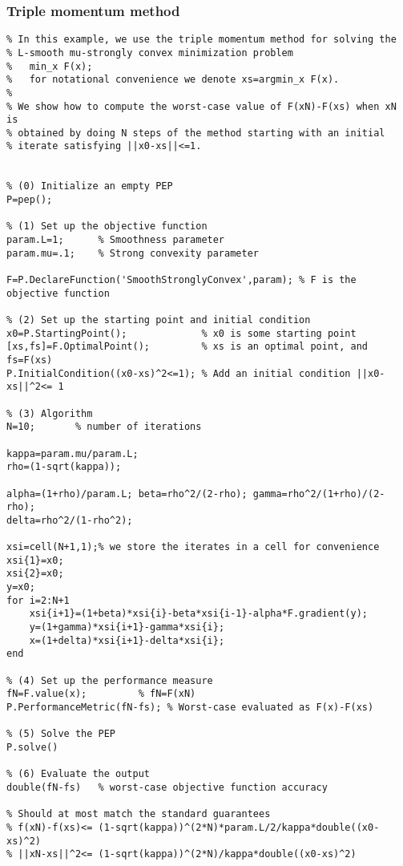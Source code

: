\documentclass[11pt,a4paper]{article}
\begin{document}
\subsubsection{Triple momentum method}
\begin{lstlisting}
% In this example, we use the triple momentum method for solving the 
% L-smooth mu-strongly convex minimization problem
%   min_x F(x); 
%   for notational convenience we denote xs=argmin_x F(x).
%
% We show how to compute the worst-case value of F(xN)-F(xs) when xN is
% obtained by doing N steps of the method starting with an initial
% iterate satisfying ||x0-xs||<=1.


% (0) Initialize an empty PEP
P=pep();

% (1) Set up the objective function
param.L=1;      % Smoothness parameter
param.mu=.1;    % Strong convexity parameter

F=P.DeclareFunction('SmoothStronglyConvex',param); % F is the objective function

% (2) Set up the starting point and initial condition
x0=P.StartingPoint();             % x0 is some starting point
[xs,fs]=F.OptimalPoint();         % xs is an optimal point, and fs=F(xs)
P.InitialCondition((x0-xs)^2<=1); % Add an initial condition ||x0-xs||^2<= 1

% (3) Algorithm
N=10;		% number of iterations

kappa=param.mu/param.L;
rho=(1-sqrt(kappa));

alpha=(1+rho)/param.L; beta=rho^2/(2-rho); gamma=rho^2/(1+rho)/(2-rho);
delta=rho^2/(1-rho^2);

xsi=cell(N+1,1);% we store the iterates in a cell for convenience
xsi{1}=x0;
xsi{2}=x0;
y=x0;
for i=2:N+1
	xsi{i+1}=(1+beta)*xsi{i}-beta*xsi{i-1}-alpha*F.gradient(y);
	y=(1+gamma)*xsi{i+1}-gamma*xsi{i};
	x=(1+delta)*xsi{i+1}-delta*xsi{i};
end

% (4) Set up the performance measure
fN=F.value(x);         % fN=F(xN)
P.PerformanceMetric(fN-fs); % Worst-case evaluated as F(x)-F(xs)

% (5) Solve the PEP
P.solve()

% (6) Evaluate the output
double(fN-fs)   % worst-case objective function accuracy

% Should at most match the standard guarantees
% f(xN)-f(xs)<= (1-sqrt(kappa))^(2*N)*param.L/2/kappa*double((x0-xs)^2)
% ||xN-xs||^2<= (1-sqrt(kappa))^(2*N)/kappa*double((x0-xs)^2)
\end{lstlisting}
\newpage 
\end{document}
